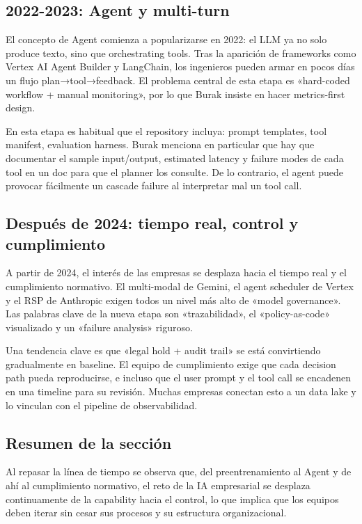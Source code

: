 \documentclass[a4paper]{article}
\begin{document}
\subsection{2022-2023: Agent y multi-turn}
El concepto de Agent comienza a popularizarse en 2022: el LLM ya no solo produce texto, sino que orchestrating tools. Tras la aparición de frameworks como Vertex AI Agent Builder y LangChain, los ingenieros pueden armar en pocos días un flujo plan→tool→feedback. El problema central de esta etapa es «hard-coded workflow + manual monitoring», por lo que Burak insiste en hacer metrics-first design.

En esta etapa es habitual que el repository incluya: prompt templates, tool manifest, evaluation harness. Burak menciona en particular que hay que documentar el sample input/output, estimated latency y failure modes de cada tool en un doc para que el planner los consulte. De lo contrario, el agent puede provocar fácilmente un cascade failure al interpretar mal un tool call.

\subsection{Después de 2024: tiempo real, control y cumplimiento}

A partir de 2024, el interés de las empresas se desplaza hacia el tiempo real y el cumplimiento normativo. El multi-modal de Gemini, el agent scheduler de Vertex y el RSP de Anthropic exigen todos un nivel más alto de «model governance». Las palabras clave de la nueva etapa son «trazabilidad», el «policy-as-code» visualizado y un «failure analysis» riguroso.

Una tendencia clave es que «legal hold + audit trail» se está convirtiendo gradualmente en baseline. El equipo de cumplimiento exige que cada decision path pueda reproducirse, e incluso que el user prompt y el tool call se encadenen en una timeline para su revisión. Muchas empresas conectan esto a un data lake y lo vinculan con el pipeline de observabilidad.

\subsection{Resumen de la sección}

Al repasar la línea de tiempo se observa que, del preentrenamiento al Agent y de ahí al cumplimiento normativo, el reto de la IA empresarial se desplaza continuamente de la capability hacia el control, lo que implica que los equipos deben iterar sin cesar sus procesos y su estructura organizacional.
\end{document}
